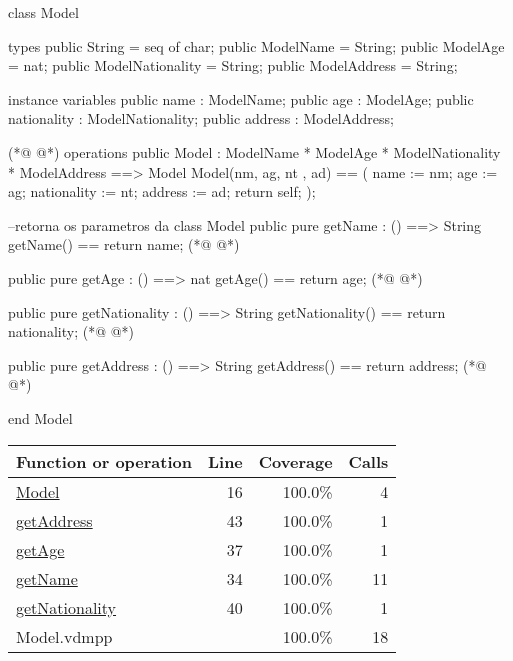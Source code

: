 \begin{vdmpp}[breaklines=true]
class Model

types
 public String = seq of char;
 public ModelName = String;
 public ModelAge = nat;
 public ModelNationality = String;
 public ModelAddress = String;
 
instance variables
 public name : ModelName;
 public age : ModelAge;
 public nationality : ModelNationality;
 public address : ModelAddress;
 
(*@
\label{Model:16}
@*)
 operations
  public Model : 
          ModelName * 
          ModelAge *
          ModelNationality * 
          ModelAddress ==> Model
  Model(nm, ag, nt , ad) ==
  (
    name := nm;
    age := ag;
    nationality := nt;
    address := ad;
    return self;
  );
  
  --retorna os parametros da class Model
  public pure getName : () ==> String
    getName() == return name;
(*@
\label{getName:34}
@*)
    
   public pure getAge : () ==> nat
     getAge() == return age;
(*@
\label{getAge:37}
@*)
     
  public pure getNationality : () ==> String
     getNationality() == return nationality;
(*@
\label{getNationality:40}
@*)
     
  public pure getAddress : () ==> String
     getAddress() == return address;      
(*@
\label{getAddress:43}
@*)
     
     
end Model
\end{vdmpp}
\bigskip
\begin{longtable}{|l|r|r|r|}
\hline
Function or operation & Line & Coverage & Calls \\
\hline
\hline
\hyperref[Model:16]{Model} & 16&100.0\% & 4 \\
\hline
\hyperref[getAddress:43]{getAddress} & 43&100.0\% & 1 \\
\hline
\hyperref[getAge:37]{getAge} & 37&100.0\% & 1 \\
\hline
\hyperref[getName:34]{getName} & 34&100.0\% & 11 \\
\hline
\hyperref[getNationality:40]{getNationality} & 40&100.0\% & 1 \\
\hline
\hline
Model.vdmpp & & 100.0\% & 18 \\
\hline
\end{longtable}

